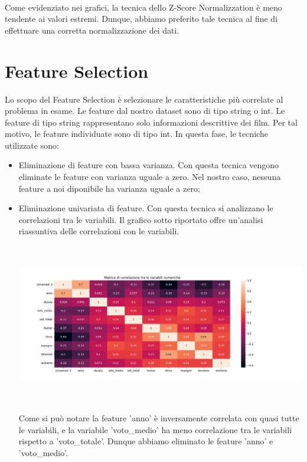 \documentclass[a4paper, 10pt]{report}
\begin{document}
            \\Come evidenziato nei grafici, la tecnica dello Z-Score Normalizzation è meno tendente ai valori estremi.
            Dunque, abbiamo preferito tale tecnica al fine di effettuare una corretta normalizzazione dei dati.

        \section{Feature Selection}\label{sec:feature-selection}
            Lo scopo del Feature Selection è selezionare le caratteristiche più correlate al problema in esame.
            Le feature dal nostro dataset sono di tipo string o int. Le feature di tipo string rappresentano
            solo informazioni descrittive dei film. Per tal motivo, le feature individuate sono di tipo int.
            In questa fase, le tecniche utilizzate sono:
            \begin{itemize}
                \item Eliminazione di feature con bassa varianza. Con questa tecnica vengono eliminate le feature
                con varianza uguale a zero. Nel nostro caso, nessuna feature a noi diponibile ha varianza uguale a zero;
                \item Eliminazione univariata di feature. Con questa tecnica si analizzano le correlazioni tra le variabili.
                Il grafico sotto riportato offre un'analisi riassuntiva delle correlazioni con le variabili.
                \begin{center}
                    \includegraphics[width=13cm, height=7cm]{dataPreparation/Matrice di Correlazione.png}\\
                \end{center}
                Come si può notare la feature 'anno' è inversamente correlata con quasi tutte le variabili, e la variabile
                'voto\_medio' ha meno correlazione tra le variabili rispetto a 'voto\_totale'.
                Dunque abbiamo eliminato le feature 'anno' e 'voto\_medio'.
            \end{itemize}
\end{document}
